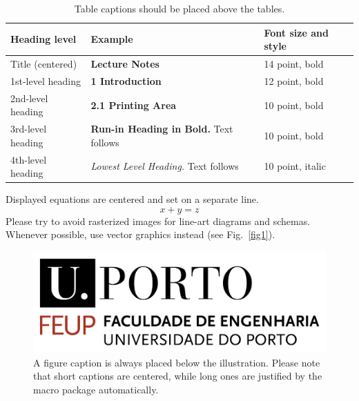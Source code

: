 \documentclass[runningheads]{llncs}
\begin{document}
\begin{table}
\caption{Table captions should be placed above the
tables.}\label{tab1}
\begin{tabular}{|l|l|l|}
\hline
Heading level &  Example & Font size and style\\
\hline
Title (centered) &  {\Large\bfseries Lecture Notes} & 14 point, bold\\
1st-level heading &  {\large\bfseries 1 Introduction} & 12 point, bold\\
2nd-level heading & {\bfseries 2.1 Printing Area} & 10 point, bold\\
3rd-level heading & {\bfseries Run-in Heading in Bold.} Text follows & 10 point, bold\\
4th-level heading & {\itshape Lowest Level Heading.} Text follows & 10 point, italic\\
\hline
\end{tabular}
\end{table}


\noindent Displayed equations are centered and set on a separate
line.
\begin{equation}
x + y = z
\end{equation}
Please try to avoid rasterized images for line-art diagrams and
schemas. Whenever possible, use vector graphics instead (see
Fig.~\ref{fig1}).

\begin{figure}
\includegraphics[width=\textwidth]{img/FEUPlogo.png}
\caption{A figure caption is always placed below the illustration.
Please note that short captions are centered, while long ones are
justified by the macro package automatically.} \label{fig3}
\end{figure}
\end{document}

